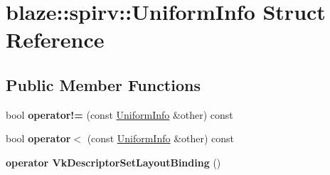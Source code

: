 \hypertarget{structblaze_1_1spirv_1_1UniformInfo}{}\section{blaze\+:\+:spirv\+:\+:Uniform\+Info Struct Reference}
\label{structblaze_1_1spirv_1_1UniformInfo}
\subsection*{Public Member Functions}
\begin{DoxyCompactItemize}
\item 
\mbox{\label{structblaze_1_1spirv_1_1UniformInfo_a4d693bed4dd5b199d2b12094a5fdbe1c}} 
bool {\bfseries operator!=} (const \hyperlink{structblaze_1_1spirv_1_1UniformInfo}{Uniform\+Info} \&other) const
\item 
\mbox{\label{structblaze_1_1spirv_1_1UniformInfo_a66940ff24b7e8a54ef7d460f557c7a6f}} 
bool {\bfseries operator$<$} (const \hyperlink{structblaze_1_1spirv_1_1UniformInfo}{Uniform\+Info} \&other) const
\item 
\mbox{\label{structblaze_1_1spirv_1_1UniformInfo_a769a3a96493a7a88593126719614af98}} 
{\bfseries operator Vk\+Descriptor\+Set\+Layout\+Binding} ()
\end{DoxyCompactItemize}
